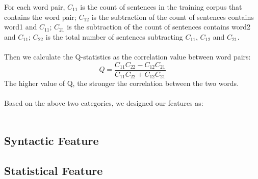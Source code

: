 For each word pair, $C_{11}$ is the count of sentences in the training corpus that contains the word pair; $C_{12}$ is the 
subtraction of the count of sentences contains word1 and $C_{11}$; $C_{21}$ is the subtraction of the count of sentences contains word2 and $C_{11}$; $C_{22}$ is the total number of sentences subtracting $C_{11}$, $C_{12}$ and $C_{21}$.\\
\\Then we calculate the Q-statistics as the correlation value between word pairs:
\begin{equation}
	Q=\frac{C_{11}C_{22} - C_{12}C_{21}}{C_{11}C_{22} + C_{12}C_{21}}
\end{equation}
The higher value of Q, the stronger the correlation between the two words.\\\\
Based on the above two categories, we designed our features as:\\\\



\subsection{Syntactic Feature}


\subsection{Statistical Feature}
